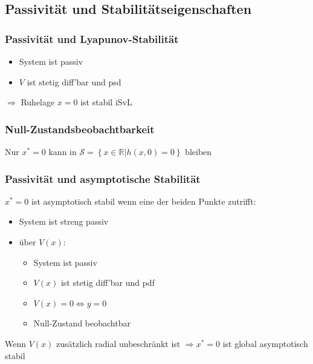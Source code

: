 \documentclass[german]{latex4ei/latex4ei_sheet}
\begin{document}
\begin{sectionbox}
\subsection{Passivität und Stabilitätseigenschaften}

\subsubsection{Passivität und Lyapunov-Stabilität}
\begin{itemize}
  \item System ist passiv
  \item $V$ ist stetig diff'bar und psd
\end{itemize}
$\Rightarrow$ Ruhelage $x=0$ ist stabil iSvL

\subsubsection{Null-Zustandsbeobachtbarkeit}
Nur $x^*=0$ kann in $\mathcal{S} = \left\{ x \in \mathbb{R} | h(x,0)=0 \right\}$ bleiben

\subsubsection{Passivität und asymptotische Stabilität}
$x^*=0$ ist asymptotisch stabil wenn eine der beiden Punkte zutrifft: \\
\begin{itemize}
  \item System ist streng passiv
  \item über $V(x)$:
    \begin{itemize}
      \item System ist passiv
      \item $V(x)$ ist stetig diff'bar und pdf
      \item $\dot{V}(x) = 0 \Leftrightarrow y = 0$
      \item Null-Zustand beobachtbar
    \end{itemize}
\end{itemize}

Wenn $V(x)$ zusätzlich radial unbeschränkt ist $\Rightarrow x^* = 0$ ist global asymptotisch stabil
\end{sectionbox}
\end{document}
